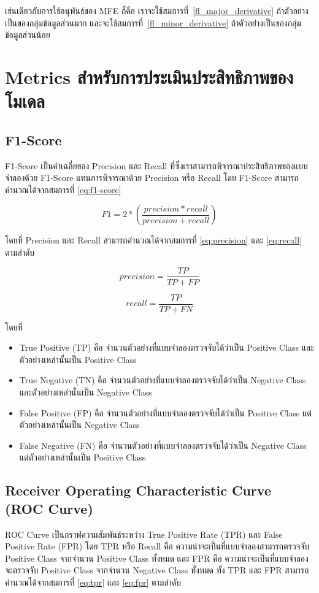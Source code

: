 เช่นเดียวกับการใช้อนุพันธ์ของ MFE ก็คือ เราจะใช้สมการที่~\ref{fl_major_derivative} ถ้าตัวอย่างเป็นของกลุ่มข้อมูลส่วนมาก และจะใช้สมการที่~\ref{fl_minor_derivative} ถ้าตัวอย่างเป็นของกลุ่มข้อมูลส่วนน้อย

\section{Metrics สำหรับการประเมินประสิทธิภาพของโมเดล}
\subsection{F1-Score}
F1-Score เป็นค่าเฉลี่ยของ Precision และ Recall ที่ซึ่งเราสามารถพิจารณาประสิทธิภาพของแบบจำลองด้วย F1-Score แทนการพิจารณาด้วย Precision หรือ Recall โดย F1-Score สามารถคำนวณได้จากสมการที่ \ref{eq:f1-score}

\begin{equation}
  F1 = 2 * \left ( \frac{precision * recall}{precision + recall} \right )
  \label{eq:f1-score}
\end{equation}

โดยที่ Precision และ Recall สามารถคำนวณได้จากสมการที่ \ref{eq:precision} และ \ref{eq:recall} ตามลำดับ

\begin{equation}
  precision = \frac{TP}{TP + FP}
  \label{eq:precision}
\end{equation}

\begin{equation}
  recall = \frac{TP}{TP + FN}
  \label{eq:recall}
\end{equation}

โดยที่

\begin{itemize}
  \item True Positive (TP) คือ จำนวนตัวอย่างที่แบบจำลองตรวจจับได้ว่าเป็น Positive Class และตัวอย่างเหล่านั้นเป็น Positive Class
  \item True Negative (TN) คือ จำนวนตัวอย่างที่แบบจำลองตรวจจับได้ว่าเป็น Negative Class และตัวอย่างเหล่านั้นเป็น Negative Class
  \item False Positive (FP) คือ จำนวนตัวอย่างที่แบบจำลองตรวจจับได้ว่าเป็น Positive Class แต่ตัวอย่างเหล่านั้นเป็น Negative Class
  \item False Negative (FN) คือ จำนวนตัวอย่างที่แบบจำลองตรวจจับได้ว่าเป็น Negative Class แต่ตัวอย่างเหล่านั้นเป็น Positive Class
\end{itemize}

\subsection{Receiver Operating Characteristic Curve (ROC Curve)}
ROC Curve เป็นกราฟความสัมพันธ์ระหว่าง True Positive Rate (TPR) และ False Positive Rate (FPR) โดย TPR หรือ Recall คือ 
ความน่าจะเป็นที่แบบจำลองสามารถตรวจจับ Positive Class จากจำนวน Positive Class ทั้งหมด และ FPR คือ 
ความน่าจะเป็นที่แบบจำลองจะตรวจจับ Positive Class จากจำนวน Negative Class ทั้งหมด ทั้ง TPR และ FPR สามารถคำนวณได้จากสมการที่ \ref{eq:tpr} และ \ref{eq:fpr} ตามลำดับ

